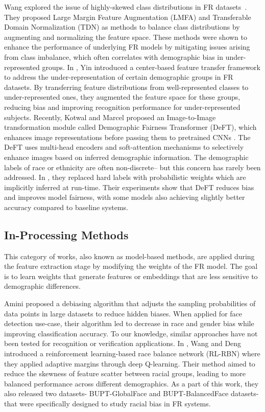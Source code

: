 Wang \etal explored the issue of highly-skewed class distributions in FR
datasets~\cite{wang2019deep}. They proposed Large Margin Feature Augmentation
(LMFA) and Transferable Domain Normalization (TDN) as methods to balance class
distributions by augmenting and normalizing the feature space. These methods
were shown to enhance the performance of underlying FR models by mitigating
issues arising from class imbalance, which often correlates with demographic
bias in under-represented groups.
%
In \cite{yin2019feature}, Yin \etal introduced a center-based feature transfer
framework to address the under-representation of certain demographic groups in
FR datasets. By transferring feature distributions from well-represented
classes to under-represented ones, they augmented the feature space for these
groups, reducing bias and improving recognition performance for
under-represented subjects. 
%
Recently, Kotwal and Marcel proposed an Image-to-Image
transformation module called Demographic Fairness Transformer (DeFT), which
enhances image representations before passing them to pretrained CNNs
\cite{kotwal2024demographic}. The DeFT uses multi-head encoders and
soft-attention mechanisms to selectively enhance images based on inferred
demographic information. The demographic labels of race or ethnicity are often
non-discrete-- but this concern has rarely been addressed. In
\cite{kotwal2024demographic}, they replaced hard labels with probabilistic
weights which are implicitly inferred at run-time. Their experiments show that
DeFT reduces bias and improves model fairness, with some models also achieving
slightly better accuracy compared to baseline systems.

\subsection{In-Processing Methods}

This category of works, also known as model-based methods, are applied during
the feature extraction stage by modifying the weights of the FR model. The goal
is to learn weights that generate features or embeddings that are less sensitive
to demographic differences.

Amini \etal \cite{amini2019uncovering} proposed a debiasing algorithm that
adjusts the sampling probabilities of data points in large datasets to reduce
hidden biases. When applied for face detection use-case, their algorithm led to
decrease in race and gender bias while improving classification accuracy. To
our knowledge, similar approaches have not been tested for recognition or
verification applications.
%
In \cite{wang2020mitigating}, Wang and Deng introduced a reinforcement
learning-based race balance network (RL-RBN) where they applied adaptive
margins through deep Q-learning. Their method aimed to reduce the skewness
of feature scatter between racial groups, leading to more balanced performance
across different demographics. As a part of this work, they also released two
datasets- BUPT-GlobalFace and BUPT-BalancedFace datasets- that were
specifically designed to study racial bias in FR systems. 

